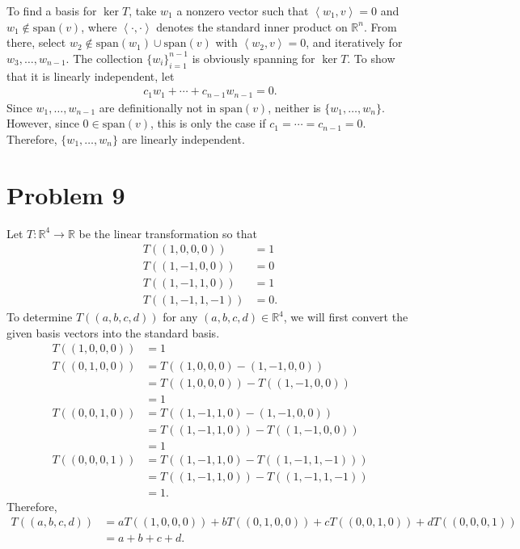 \documentclass[8pt]{extarticle}
\newcommand{\R}{\mathbb{R}}
\newcommand{\iprod}[2]{\left\langle #1,#2\right\rangle}
\begin{document}
  To find a basis for $\ker T$, take $w_1$ a nonzero vector such that $\iprod{w_1}{v} = 0$ and $w_1\notin \text{span}(v)$, where $\iprod{\cdot}{\cdot}$ denotes the standard inner product on $\R^n$. From there, select $w_2\notin \text{span}(w_1)\cup \text{span}(v)$ with $\iprod{w_2}{v} = 0$, and iteratively for $w_3,\dots,w_{n-1}$. The collection $\{w_i\}_{i=1}^{n-1}$ is obviously spanning for $\ker T$. To show that it is linearly independent, let
  \begin{align*}
    c_1w_1 + \cdots + c_{n-1}w_{n-1} = 0.
  \end{align*}
  Since $w_1,\dots,w_{n-1}$ are definitionally not in $\text{span}(v)$, neither is $\{w_1,\dots,w_n\}$. However, since $0\in \text{span}(v)$, this is only the case if $c_1=\cdots=c_{n-1} = 0$. Therefore, $\{w_1,\dots,w_n\}$ are linearly independent.
  \section{Problem 9}%
  Let $T: \R^4 \rightarrow \R$ be the linear transformation so that
  \begin{align*}
    T((1,0,0,0)) &= 1\\
    T((1,-1,0,0)) &= 0\\
    T((1,-1,1,0)) &= 1\\
    T((1,-1,1,-1)) &= 0.
  \end{align*}
  To determine $T((a,b,c,d))$ for any $(a,b,c,d)\in \R^4$, we will first convert the given basis vectors into the standard basis.
  \begin{align*}
    T((1,0,0,0)) &= 1\\
    T((0,1,0,0)) &= T((1,0,0,0) - (1,-1,0,0))\\
                 &= T((1,0,0,0)) - T((1,-1,0,0)) \\
                 &= 1\\
    T((0,0,1,0)) &= T((1,-1,1,0) - (1,-1,0,0))\\
                 &= T((1,-1,1,0)) - T((1,-1,0,0))\\
                 &= 1\\
    T((0,0,0,1)) &= T((1,-1,1,0) - T((1,-1,1,-1)))\\
                 &= T((1,-1,1,0)) - T((1,-1,1,-1))\\
                 &= 1.
  \end{align*}
  Therefore,
  \begin{align*}
    T((a,b,c,d)) &= aT((1,0,0,0)) + bT((0,1,0,0)) + cT((0,0,1,0)) + dT((0,0,0,1))\\
                 &= a + b + c + d.
  \end{align*}
\end{document}
